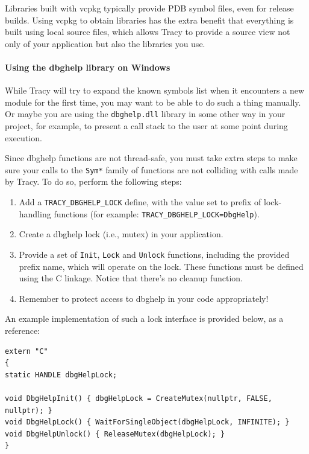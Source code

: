 \documentclass[hidelinks,titlepage,a4paper]{article}
\begin{document}
Libraries built with vcpkg typically provide PDB symbol files, even for release builds. Using vcpkg to obtain libraries has the extra benefit that everything is built using local source files, which allows Tracy to provide a source view not only of your application but also the libraries you use.

\paragraph{Using the dbghelp library on Windows}

While Tracy will try to expand the known symbols list when it encounters a new module for the first time, you may want to be able to do such a thing manually. Or maybe you are using the \texttt{dbghelp.dll} library in some other way in your project, for example, to present a call stack to the user at some point during execution.

Since dbghelp functions are not thread-safe, you must take extra steps to make sure your calls to the \texttt{Sym*} family of functions are not colliding with calls made by Tracy. To do so, perform the following steps:

\begin{enumerate}
\item Add a \texttt{TRACY\_DBGHELP\_LOCK} define, with the value set to prefix of lock-handling functions (for example: \texttt{TRACY\_DBGHELP\_LOCK=DbgHelp}).
\item Create a dbghelp lock (i.e., mutex) in your application.
\item Provide a set of \texttt{Init}, \texttt{Lock} and \texttt{Unlock} functions, including the provided prefix name, which will operate on the lock. These functions must be defined using the C linkage. Notice that there's no cleanup function.
\item Remember to protect access to dbghelp in your code appropriately!
\end{enumerate}

An example implementation of such a lock interface is provided below, as a reference:

\begin{lstlisting}
extern "C"
{
static HANDLE dbgHelpLock;

void DbgHelpInit() { dbgHelpLock = CreateMutex(nullptr, FALSE, nullptr); }
void DbgHelpLock() { WaitForSingleObject(dbgHelpLock, INFINITE); }
void DbgHelpUnlock() { ReleaseMutex(dbgHelpLock); }
}
\end{lstlisting}
\end{document}
